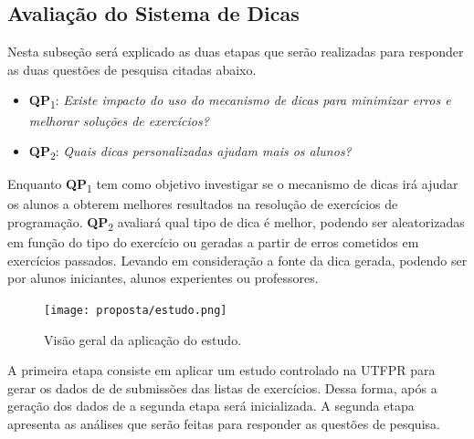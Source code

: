 \subsection{Avaliação do Sistema de Dicas}

Nesta subseção será explicado as duas etapas que serão realizadas para responder as duas questões de pesquisa citadas abaixo.

\begin{itemize}
	\item \textbf{QP}\textsubscript{1}: 
	\textit{Existe impacto do uso do mecanismo de dicas para minimizar erros e melhorar soluções de exercícios?}
	\foreign
	\item \textbf{QP}\textsubscript{2}: 
	\textit{Quais dicas personalizadas ajudam mais os alunos?}
\end{itemize}

Enquanto \textbf{QP}\textsubscript{1} tem como objetivo investigar se o mecanismo de dicas irá ajudar os alunos a obterem melhores resultados na resolução de exercícios de programação. \textbf{QP}\textsubscript{2} avaliará qual tipo de dica é melhor, podendo ser aleatorizadas em função do tipo do exercício ou geradas a partir de erros cometidos em exercícios passados. Levando em consideração a fonte da dica gerada, podendo ser por alunos iniciantes, alunos experientes ou professores.

\begin{figure}[]
	\centering
	\captionsetup{justification=centering}
	\texttt{[image: proposta/estudo.png]}
	\caption{Visão geral da aplicação do estudo.}
	\label{figura:estudo}
\end{figure}

A primeira etapa consiste em aplicar um estudo controlado na UTFPR para gerar os dados de  de submissões das listas de exercícios. Dessa forma, após a geração dos dados de  a segunda etapa será inicializada. A segunda etapa apresenta as análises que serão feitas para responder as questões de pesquisa.

